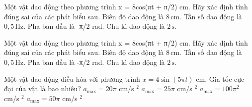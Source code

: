 \begin{ex}
Một vật dao động theo phương trình x = 8cos(πt + π/2) cm. Hãy xác định tính đúng sai của các phát biểu sau.
\choiceTF
{\True Biên độ dao động là $8\,\text{cm}$.}
{\True Tần số dao động là $0,5\,\text{Hz}$.}
{Pha ban đầu là -π/2 rad.}
{\True Chu kì dao động là $2\,\text{s}$.}
\end{ex}

\begin{ex}
Một vật dao động theo phương trình x = 8cos(πt + π/2) cm. Hãy xác định tính đúng sai của các phát biểu sau.
\choiceTF
{\True Biên độ dao động là $8\,\text{cm}$.}
{\True Tần số dao động là $0,5\,\text{Hz}$.}
{Pha ban đầu là -π/2 rad.}
{\True Chu kì dao động là $2\,\text{s}$.}
\end{ex}

\begin{ex}
Một vật dao động điều hòa với phương trình $x = 4\sin(5\pi t)$ cm. Gia tốc cực đại của vật là bao nhiêu?
\choice
{$a_{\max} = 20\pi$ cm/s $^2$}
{$a_{\max} = 25\pi$ cm/s $^2$}
{\True $a_{\max} = 100\pi^2$ cm/s $^2$}
{$a_{\max} = 50\pi$ cm/s $^2$}
\end{ex}

